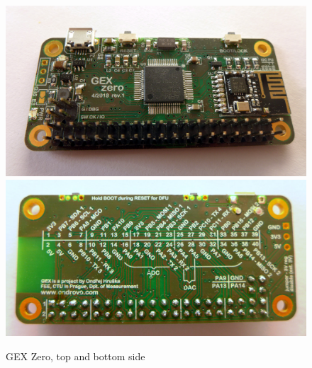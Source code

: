 \begin{figure}[h]
	\centering
	\includegraphics[width=.9\textwidth]{img/photo-zero-naked.jpg} \\
	\vspace{1mm}
	\includegraphics[width=.9\textwidth]{img/photo-zero-naked-bottom.jpg}
	\caption[The GEX Zero module]{\label{fig:gexz}GEX Zero, top and bottom side}
\end{figure}

